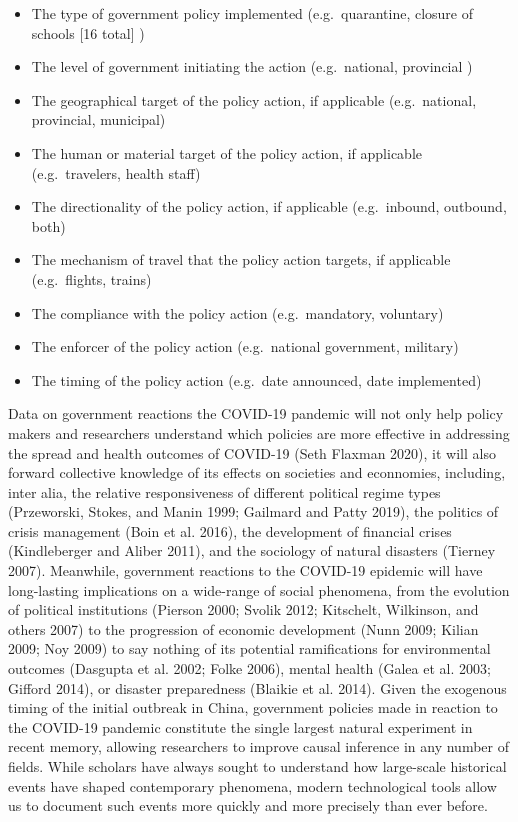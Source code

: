 \documentclass[]{article}
\providecommand{\tightlist}{%
  \setlength{\itemsep}{0pt}\setlength{\parskip}{0pt}}
\begin{document}
\begin{itemize}
\tightlist
\item
  The type of government policy implemented (e.g.~quarantine, closure of schools {[}16 total{]} )
\item
  The level of government initiating the action (e.g.~national, provincial )
\item
  The geographical target of the policy action, if applicable (e.g.~national, provincial, municipal)
\item
  The human or material target of the policy action, if applicable (e.g.~travelers, health staff)
\item
  The directionality of the policy action, if applicable (e.g.~inbound, outbound, both)
\item
  The mechanism of travel that the policy action targets, if applicable (e.g.~flights, trains)
\item
  The compliance with the policy action (e.g.~mandatory, voluntary)
\item
  The enforcer of the policy action (e.g.~national government, military)
\item
  The timing of the policy action (e.g.~date announced, date implemented)
\end{itemize}

Data on government reactions the COVID-19 pandemic will not only help policy makers and researchers understand which policies are more effective in addressing the spread and health outcomes of COVID-19 (Seth Flaxman 2020), it will also forward collective knowledge of its effects on societies and econnomies, including, inter alia, the relative responsiveness of different political regime types (Przeworski, Stokes, and Manin 1999; Gailmard and Patty 2019), the politics of crisis management (Boin et al. 2016), the development of financial crises (Kindleberger and Aliber 2011), and the sociology of natural disasters (Tierney 2007). Meanwhile, government reactions to the COVID-19 epidemic will have long-lasting implications on a wide-range of social phenomena, from the evolution of political institutions (Pierson 2000; Svolik 2012; Kitschelt, Wilkinson, and others 2007) to the progression of economic development (Nunn 2009; Kilian 2009; Noy 2009) to say nothing of its potential ramifications for environmental outcomes (Dasgupta et al. 2002; Folke 2006), mental health (Galea et al. 2003; Gifford 2014), or disaster preparedness (Blaikie et al. 2014). Given the exogenous timing of the initial outbreak in China, government policies made in reaction to the COVID-19 pandemic constitute the single largest natural experiment in recent memory, allowing researchers to improve causal inference in any number of fields. While scholars have always sought to understand how large-scale historical events have shaped contemporary phenomena, modern technological tools allow us to document such events more quickly and more precisely than ever before.
\end{document}
